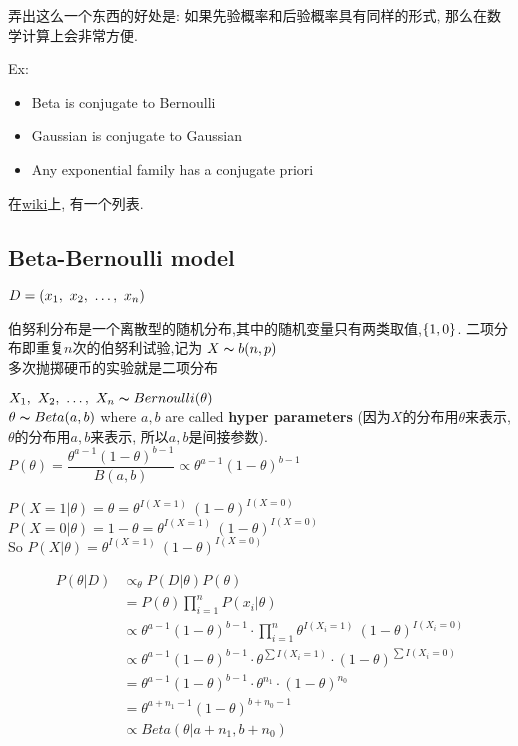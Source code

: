 \documentclass{article}
\begin{document}
弄出这么一个东西的好处是: 如果先验概率和后验概率具有同样的形式, 那么在数学计算上会非常方便.

Ex:
\begin{itemize}
\item Beta is conjugate to Bernoulli
\item Gaussian is conjugate to Gaussian
\item Any exponential family has a conjugate priori
\end{itemize}

在\href{http://en.wikipedia.org/wiki/Conjugate\_prior\_distribution#Table\_of\_conjugate\_distributions}{wiki}上, 有一个列表.

\subsection{Beta-Bernoulli model}
$D = (x_1,~x_2,~\ldots,~x_n)$

伯努利分布是一个离散型的随机分布,其中的随机变量只有两类取值,$\{1,0\}$.
二项分布即重复$n$次的伯努利试验,记为 $X \thicksim{b}(n,p)$\\
多次抛掷硬币的实验就是二项分布

$X_1,~X_2,~\ldots,~X_n \thicksim{B}ernoulli(\theta)$\\
$\theta \thicksim{B}eta(a,b)$ where $a,b$ are called \textbf{hyper parameters}
(因为$X$的分布用$\theta$来表示, $\theta$的分布用$a,b$来表示, 所以$a,b$是间接参数).\\
$P(\theta) = \dfrac{\theta^{a-1}(1-\theta)^{b-1}}{B(a,b)} \propto \theta^{a-1}(1-\theta)^{b-1}$

\noindent
$P(X = 1|\theta) = \theta = \theta^{I(X=1)}\ (1-\theta)^{I(X=0)}$\\
$P(X = 0|\theta) = 1 - \theta = \theta^{I(X=1)}\ (1-\theta)^{I(X=0)}$\\
So $P(X|\theta) = \theta^{I(X=1)}\ (1-\theta)^{I(X=0)}$


$$
\begin{aligned}
P(\theta | D) 
& \propto_{\theta} P(D|\theta)P(\theta)\\
& = P(\theta) \prod_{i=1}^n P(x_i|\theta)\\
& \propto \theta^{a-1}(1-\theta)^{b-1} \cdot \prod_{i=1}^n \theta^{I(X_i=1)}\ (1-\theta)^{I(X_i=0)}\\
& \propto \theta^{a-1}(1-\theta)^{b-1} \cdot \theta^{\sum I(X_i=1)} \cdot (1-\theta)^{\sum I(X_i=0)}\\
& = \theta^{a-1}(1-\theta)^{b-1} \cdot \theta^{n_1} \cdot (1-\theta)^{n_0}\\
& = \theta^{a + n_1 - 1} (1-\theta)^{b + n_0 -1}\\
& \propto Beta(\theta | a + n_1, b + n_0)\\
\end{aligned}
$$
\end{document}
